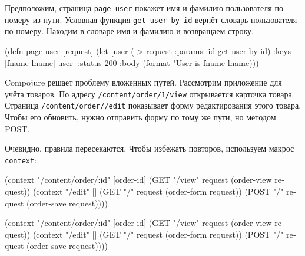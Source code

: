 Предположим, страница \verb|page-user| покажет имя и фамилию пользователя по
номеру из пути. Условная функция \verb|get-user-by-id| вернёт словарь
пользователя по номеру. Находим в словаре имя и фамилию и возвращаем строку.

\ifx\DEVICETYPE\MOBILE

\begin{english}
  \begin{clojure}
(defn page-user [request]
   (let [user (-> request
                  :params
                  :id
                  get-user-by-id)
         {:keys [fname lname]} user]
     {:status 200
      :body (format "User is %
                    fname lname)}))
  \end{clojure}
\end{english}

\else

\begin{english}
\end{english}

\fi

\mnoindent
Compojure решает проблему вложенных путей. Рассмотрим приложение для учёта
товаров. По адресу \verb|/content/order/1/view| открывается карточка
товара. Страница \texttt{/content/order//edit} показывает форму редактирования
этого товара. Чтобы его обновить, нужно отправить форму по тому же пути, но
методом POST.

Очевидно, правила пересекаются. Чтобы избежать повторов, используем макрос
\texttt{con\-text}:


\ifx\DEVICETYPE\MOBILE

\begin{english}
  \begin{clojure}
(context "/content/order/:id" [order-id]
  (GET  "/view" request
        (order-view request))
  (context "/edit" []
    (GET  "/" request
          (order-form request))
    (POST "/" request
          (order-save request))))
  \end{clojure}
\end{english}

\else

\begin{english}
  \begin{clojure}
(context "/content/order/:id" [order-id]
  (GET  "/view" request (order-view request))
  (context "/edit" []
    (GET  "/" request (order-form request))
    (POST "/" request (order-save request))))
  \end{clojure}
\end{english}

